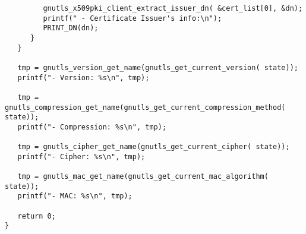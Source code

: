 \begin{verbatim}
         gnutls_x509pki_client_extract_issuer_dn( &cert_list[0], &dn);
         printf(" - Certificate Issuer's info:\n");
         PRINT_DN(dn);
      }
   }

   tmp = gnutls_version_get_name(gnutls_get_current_version( state));
   printf("- Version: %s\n", tmp);

   tmp = gnutls_compression_get_name(gnutls_get_current_compression_method( state));
   printf("- Compression: %s\n", tmp);

   tmp = gnutls_cipher_get_name(gnutls_get_current_cipher( state));
   printf("- Cipher: %s\n", tmp);

   tmp = gnutls_mac_get_name(gnutls_get_current_mac_algorithm( state));
   printf("- MAC: %s\n", tmp);

   return 0;
}

\end{verbatim}
